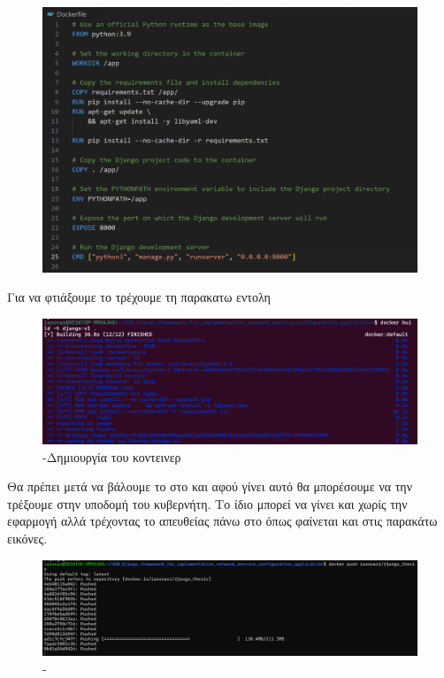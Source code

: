 \begin{figure}[htb]
	\centering
	\includegraphics[width=1.5\textwidth]{graphics/dockerfile.png}
	\caption{}
\end{figure}

\FloatBarrier


Για να φτιάξουμε το  τρέχουμε τη παρακατω εντολη

\FloatBarrier
\begin{figure}[h]
	\centering
	\includegraphics[width=1.5\textwidth]{graphics/docker_build.png}
	\caption{-Δημιουργία του κοντεινερ}
\end{figure}


Θα πρέπει μετά να βάλουμε το  στο  και αφού γίνει αυτό θα μπορέσουμε να την τρέξουμε στην υποδομή του κυβερνήτη.
Το ίδιο μπορεί να γίνει και χωρίς την εφαρμογή  αλλά τρέχοντας το 
απευθείας πάνω στο  όπως φαίνεται και στις παρακάτω εικόνες.

\FloatBarrier
\begin{figure}[h]
	\centering
	\includegraphics[width=1.5\textwidth]{graphics/dockerpush.png}
	\caption{-}
\end{figure}


